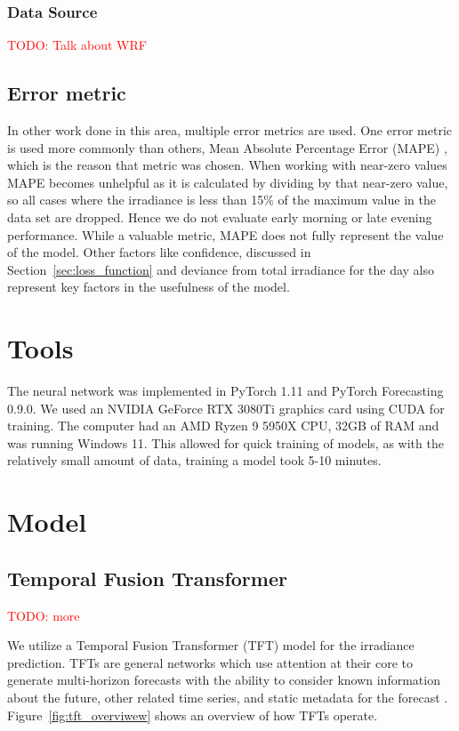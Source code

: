 \subsubsection{Data Source}\label{cha:WRF}
\textcolor{red}{TODO: Talk about WRF} \cite{gueymard_global_2008, rognvaldsson_numerical_2013, jimenez_wrf-solar_2016}


\subsection{Error metric}
In other work done in this area, multiple error metrics are used. One error metric is used more commonly than others, Mean Absolute Percentage Error (MAPE) \cite{lin_temporal_2020, lee_forecasting_2018, jaidee_very_2019, su_machine_2019}, which is the reason that metric was chosen.
When working with near-zero values MAPE becomes unhelpful as it is calculated by dividing by that near-zero value, so all cases where the irradiance is less than 15\% of the maximum value in the data set are dropped. Hence we do not evaluate early morning or late evening performance.
While a valuable metric, MAPE does not  fully represent the value of the model. Other factors like confidence, discussed in Section~\ref{sec:loss_function} and deviance from total irradiance for the day also represent key factors in the usefulness of the model.




\section{Tools}
The neural network was implemented in PyTorch 1.11 and PyTorch Forecasting 0.9.0. We used an NVIDIA GeForce RTX 3080Ti graphics card using CUDA for training. The computer had an AMD Ryzen 9 5950X CPU, 32GB of RAM and was running Windows 11.
This allowed for quick training of models, as with the relatively small amount of data, training a model took 5-10 minutes.


\section{Model}
    \subsection{Temporal Fusion Transformer}
    \textcolor{red}{TODO: more}
    
    We utilize a Temporal Fusion Transformer (TFT) model for the irradiance prediction.
    TFTs are  general networks which use attention at their core to generate multi-horizon forecasts with the ability to consider
    known information about the future, other related time series, and static metadata for the forecast \cite{lim_temporal_2020}. Figure~\ref{fig:tft_overviwew} shows an overview of how TFTs operate.
    
